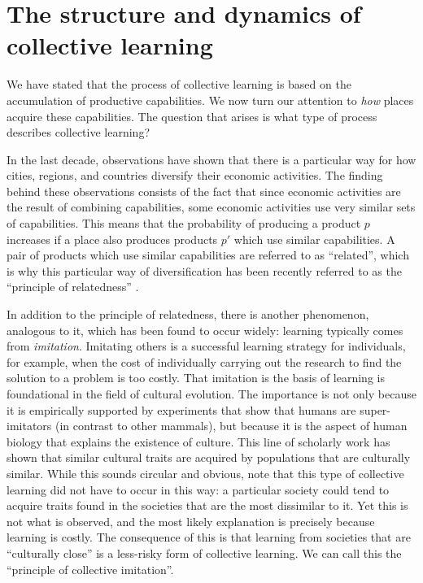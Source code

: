 \documentclass[12pt]{article}
\begin{document}

\section{The structure and dynamics of collective learning}
We have stated that the process of collective learning is based on the accumulation of productive capabilities. We now turn our attention to \emph{how} places acquire these capabilities. The question that arises is what type of process describes collective learning? 

In the last decade, observations have shown that there is a particular way for how cities, regions, and countries diversify their economic activities. The finding behind these observations consists of the fact that since economic activities are the result of combining capabilities, some economic activities use very similar sets of capabilities. This means that the probability of producing a product $p$ increases if a place also produces products $p'$ which use similar capabilities. A pair of products which use similar capabilities are referred to as ``related'', which is why this particular way of diversification has been recently referred to as the ``principle of relatedness'' \citep{HidalgoEtAl2007,Neffke2013SkillRelatedness,hidalgo2018principle}. 

In addition to the principle of relatedness, there is another phenomenon, analogous to it, which has been found to occur widely: learning typically comes from \emph{imitation}. Imitating others is a successful learning strategy for individuals, for example, when the cost of individually carrying out the research to find the solution to a problem is too costly. That imitation is the basis of learning is foundational in the field of cultural evolution. The importance is not only because it is empirically supported by experiments that show that humans are super-imitators (in contrast to other mammals), but because it is the aspect of human biology that explains the existence of culture. This line of scholarly work has shown that similar cultural traits are acquired by populations that are culturally similar. While this sounds circular and obvious, note that this type of collective learning did not have to occur in this way: a particular society could tend to acquire traits found in the societies that are the most dissimilar to it. Yet this is not what is observed, and the most likely explanation is precisely because learning is costly. The consequence of this is that learning from societies that are ``culturally close'' is a less-risky form of collective learning. We can call this the ``principle of collective imitation''.
\end{document}
